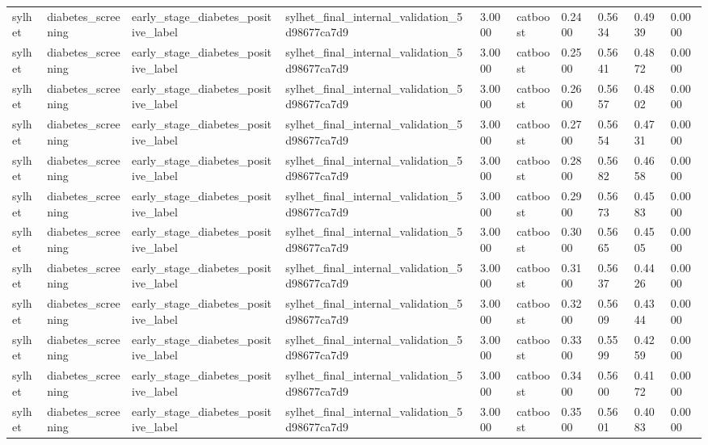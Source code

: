 \begin{tabular}{llllllllll}
sylhet & diabetes\_screening & early\_stage\_diabetes\_positive\_label & sylhet\_final\_internal\_validation\_5d98677ca7d9 & 3.0000 & catboost & 0.2400 & 0.5634 & 0.4939 & 0.0000 \\
sylhet & diabetes\_screening & early\_stage\_diabetes\_positive\_label & sylhet\_final\_internal\_validation\_5d98677ca7d9 & 3.0000 & catboost & 0.2500 & 0.5641 & 0.4872 & 0.0000 \\
sylhet & diabetes\_screening & early\_stage\_diabetes\_positive\_label & sylhet\_final\_internal\_validation\_5d98677ca7d9 & 3.0000 & catboost & 0.2600 & 0.5657 & 0.4802 & 0.0000 \\
sylhet & diabetes\_screening & early\_stage\_diabetes\_positive\_label & sylhet\_final\_internal\_validation\_5d98677ca7d9 & 3.0000 & catboost & 0.2700 & 0.5654 & 0.4731 & 0.0000 \\
sylhet & diabetes\_screening & early\_stage\_diabetes\_positive\_label & sylhet\_final\_internal\_validation\_5d98677ca7d9 & 3.0000 & catboost & 0.2800 & 0.5682 & 0.4658 & 0.0000 \\
sylhet & diabetes\_screening & early\_stage\_diabetes\_positive\_label & sylhet\_final\_internal\_validation\_5d98677ca7d9 & 3.0000 & catboost & 0.2900 & 0.5673 & 0.4583 & 0.0000 \\
sylhet & diabetes\_screening & early\_stage\_diabetes\_positive\_label & sylhet\_final\_internal\_validation\_5d98677ca7d9 & 3.0000 & catboost & 0.3000 & 0.5665 & 0.4505 & 0.0000 \\
sylhet & diabetes\_screening & early\_stage\_diabetes\_positive\_label & sylhet\_final\_internal\_validation\_5d98677ca7d9 & 3.0000 & catboost & 0.3100 & 0.5637 & 0.4426 & 0.0000 \\
sylhet & diabetes\_screening & early\_stage\_diabetes\_positive\_label & sylhet\_final\_internal\_validation\_5d98677ca7d9 & 3.0000 & catboost & 0.3200 & 0.5609 & 0.4344 & 0.0000 \\
sylhet & diabetes\_screening & early\_stage\_diabetes\_positive\_label & sylhet\_final\_internal\_validation\_5d98677ca7d9 & 3.0000 & catboost & 0.3300 & 0.5599 & 0.4259 & 0.0000 \\
sylhet & diabetes\_screening & early\_stage\_diabetes\_positive\_label & sylhet\_final\_internal\_validation\_5d98677ca7d9 & 3.0000 & catboost & 0.3400 & 0.5600 & 0.4172 & 0.0000 \\
sylhet & diabetes\_screening & early\_stage\_diabetes\_positive\_label & sylhet\_final\_internal\_validation\_5d98677ca7d9 & 3.0000 & catboost & 0.3500 & 0.5601 & 0.4083 & 0.0000 \\

\end{tabular}
